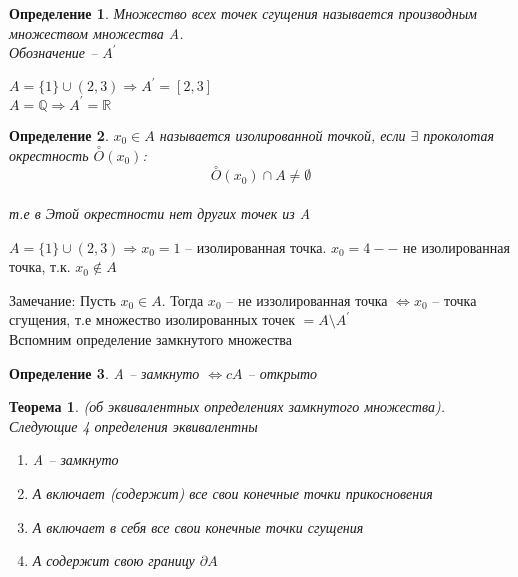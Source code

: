 \documentclass{book}
\newtheorem{Def}{Определение}[chapter]
\newtheorem{Th}{Теорема}[chapter]
\begin{document}
\begin{Def}
	Множество всех точек сгущения называется производным множеством множества A.\\
	Обозначение -- $A^{\prime}$
	
\end{Def}
$A = \{1\}\cup (2, 3) \Rightarrow A^{\prime}=[2, 3]$\\
$A=\mathds{Q}\Rightarrow A^{\prime}=\mathds{R}$
\begin{Def}
	$x_0 \in A$ называется изолированной точкой, если $\exists$ проколотая окрестность $\overset{\circ}{O}(x_0)$:\\
	$$\overset{\circ}{O}(x_0)\cap A \neq \emptyset$$\\
	т.е в Этой окрестности нет других точек из A
\end{Def}

$A=\{1\}\cup (2, 3) \Rightarrow x_0 =1$ -- изолированная точка. $x_0 = 4 --$ не изолированная точка, т.к. $x_0 \notin A$

Замечание: Пусть $x_0 \in A$. Тогда $x_0$ -- не иззолированная точка $\Leftrightarrow x_0$ -- точка сгущения, т.е множество изолированных точек $= A\setminus A^{\prime}$\\

Вспомним определение замкнутого множества\\
\begin{Def}
	A -- замкнуто $\Leftrightarrow cA$ -- открыто
\end{Def}

\begin{Th}
	(об эквивалентных определениях замкнутого множества). Следующие 4 определения эквивалентны\\
	\begin{enumerate}
		\item A -- замкнуто
		\item А включает (содержит) все свои конечные точки прикосновения
		\item А включает в себя все свои конечные точки сгущения
		\item А содержит свою границу $\partial A$	
	\end{enumerate}	 
\end{Th}
\end{document}
